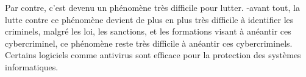\documentclass[12pt,a4paper,titlepage]{article}
\begin{document}
Par contre, c’est devenu un phénomène très difficile pour
lutter.
-avant tout, la lutte contre ce phénomène devient de plus en
plus très difficile à identifier les criminels, malgré les loi, les
sanctions, et les formations visant à anéantir ces
cybercriminel, ce phénomène reste très difficile à anéantir
ces cybercriminels. Certains logiciels comme antivirus sont
efficace pour la protection des systèmes informatiques.
\end{document}
